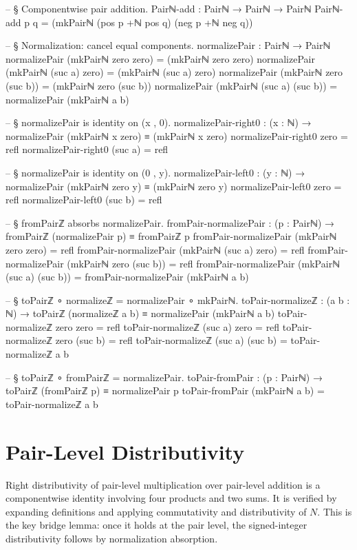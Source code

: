 \documentclass[11pt,a4paper]{book}
\def\mathbb#1{#1}%
\begin{document}
\begin{code}
-- § Componentwise pair addition.
Pairℕ-add : Pairℕ → Pairℕ → Pairℕ
Pairℕ-add p q = (mkPairℕ (pos p +ℕ pos q) (neg p +ℕ neg q))

-- § Normalization: cancel equal components.
normalizePair : Pairℕ → Pairℕ
normalizePair (mkPairℕ zero zero) = (mkPairℕ zero zero)
normalizePair (mkPairℕ (suc a) zero) = (mkPairℕ (suc a) zero)
normalizePair (mkPairℕ zero (suc b)) = (mkPairℕ zero (suc b))
normalizePair (mkPairℕ (suc a) (suc b)) = normalizePair (mkPairℕ a b)

-- § normalizePair is identity on (x , 0).
normalizePair-right0 : (x : ℕ) → normalizePair (mkPairℕ x zero) ≡ (mkPairℕ x zero)
normalizePair-right0 zero = refl
normalizePair-right0 (suc a) = refl

-- § normalizePair is identity on (0 , y).
normalizePair-left0 : (y : ℕ) → normalizePair (mkPairℕ zero y) ≡ (mkPairℕ zero y)
normalizePair-left0 zero = refl
normalizePair-left0 (suc b) = refl

-- § fromPairℤ absorbs normalizePair.
fromPair-normalizePair : (p : Pairℕ) → fromPairℤ (normalizePair p) ≡ fromPairℤ p
fromPair-normalizePair (mkPairℕ zero zero) = refl
fromPair-normalizePair (mkPairℕ (suc a) zero) = refl
fromPair-normalizePair (mkPairℕ zero (suc b)) = refl
fromPair-normalizePair (mkPairℕ (suc a) (suc b)) = fromPair-normalizePair (mkPairℕ a b)

-- § toPairℤ ∘ normalizeℤ = normalizePair ∘ mkPairℕ.
toPair-normalizeℤ : (a b : ℕ) → toPairℤ (normalizeℤ a b) ≡ normalizePair (mkPairℕ a b)
toPair-normalizeℤ zero zero = refl
toPair-normalizeℤ (suc a) zero = refl
toPair-normalizeℤ zero (suc b) = refl
toPair-normalizeℤ (suc a) (suc b) = toPair-normalizeℤ a b

-- § toPairℤ ∘ fromPairℤ = normalizePair.
toPair-fromPair : (p : Pairℕ) → toPairℤ (fromPairℤ p) ≡ normalizePair p
toPair-fromPair (mkPairℕ a b) = toPair-normalizeℤ a b
\end{code}

\section{Pair-Level Distributivity}

Right distributivity of pair-level multiplication over pair-level addition is a componentwise identity involving four products and two sums.
It is verified by expanding definitions and applying commutativity and distributivity of $\mathbb{N}$.
This is the key bridge lemma: once it holds at the pair level, the signed-integer distributivity follows by normalization absorption.
\end{document}

